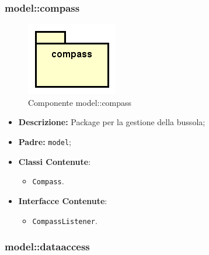 \documentclass[../DefinizioneDiProdotto.tex]{subfiles}
\begin{document}
\subsubsection{model::\-compass}

\begin{figure}[H]
	\centering
	\includegraphics[width=\maxwidth]{img/package/compass.png}
	\caption{Componente model::\-compass}\label{fig:model::compass} 
\end{figure}
\begin{itemize}
	\item \textbf{Descrizione:} Package per la gestione della bussola;
	\item \textbf{Padre:} \texttt{model};
	\item \textbf{Classi Contenute}:
	\begin{itemize}
		\item \texttt{Compass}.
		
	\end{itemize}
	\item \textbf{Interfacce Contenute}:
	\begin{itemize}
		\item \texttt{CompassListener}.
		
	\end{itemize}
\end{itemize}

\subsubsection{model::\-dataaccess}
\end{document}
